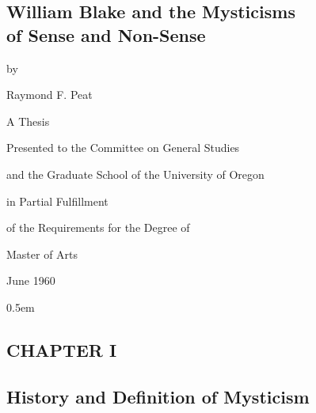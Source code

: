 \begin{center}
	\vspace*{\fill}
	
	\section*{William Blake and the Mysticisms \\ of Sense and Non-Sense}
	
	\vspace*{\fill}
	
	by
	
	\vspace*{\baselineskip}
	
	Raymond F. Peat
	
	\vspace*{\fill}
	
	A Thesis
	
	\vspace*{\baselineskip}
	
	Presented to the Committee on General Studies
	
	and the Graduate School of the University of Oregon
	
	in Partial Fulfillment
	
	of the Requirements for the Degree of
	
	Master of Arts
	
	\vspace*{\baselineskip}
	
	June 1960
	\vspace*{\fill}
\end{center}

\newpage

\tableofcontents

\newpage
\openup 0.5em

\begin{center}
	\section[Chapter I: History and Definition of Mysticism]{CHAPTER I}
	\subsection*{History and Definition of Mysticism}
\end{center}



